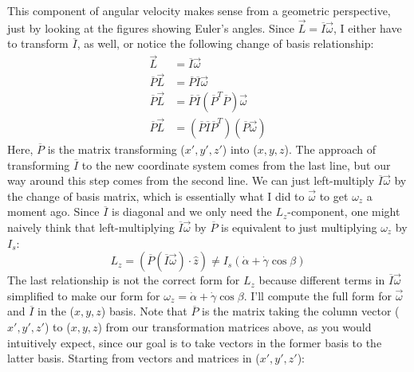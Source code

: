 \documentclass[10pt]{article}
\begin{document}
This component of angular velocity makes sense from a geometric perspective, 
just by looking at the figures showing Euler's angles. 
Since $\vec{L} = \overline{I}\vec{\omega}$, I either have to transform 
$\overline{I}$, as well, or notice the following change of basis 
relationship:
\begin{align*}
    \vec{L} &= \overline{I}\vec{\omega} \\
    \overline{P}\vec{L} &= \overline{P}\overline{I}\vec{\omega} \\
    \overline{P}\vec{L} &= 
        \overline{P}\overline{I}
        \left(\overline{P}^T\overline{P}\right)\vec{\omega} \\
    \overline{P}\vec{L} &=
        \left(\overline{P}\overline{I}\overline{P}^T\right)
        \left(\overline{P}\vec{\omega}\right)
\end{align*}
Here, $\overline{P}$ is the matrix transforming 
($x',y',z'$) into ($x,y,z$).
The approach of transforming $\overline{I}$ to the new coordinate system 
comes from the last line, but our way around this step comes from the 
second line. We can just left-multiply $\overline{I}\vec{\omega}$ by 
the change of basis matrix, which is essentially what I 
did to $\vec\omega$ to get $\omega_z$ a moment ago. Since $\overline{I}$ is 
diagonal and we only need the $L_z$-component, one might naively think 
that left-multiplying 
$\overline{I}\vec{\omega}$ by $\overline{P}$ is equivalent to just multiplying 
$\omega_z$ by $I_s$:
\begin{equation*}
    L_z = \left(\overline{P}
        \left(\overline{I}\vec{\omega}\right)\cdot\hat{z}\right) \neq 
        I_s(\dot\alpha + \dot\gamma\cos\beta)
\end{equation*}
The last relationship is not the correct form for $L_z$ 
because different terms in $\overline{I}\vec{\omega}$ simplified to make
our form for $\omega_z = \dot\alpha+\dot\gamma\cos\beta$. 
I'll compute the full form for $\vec\omega$ and $\overline{I}$ in the 
($x,y,z$) basis. Note that $\overline{P}$ is the matrix taking the 
column vector ($x',y',z'$) to ($x,y,z$) from our transformation matrices 
above, as you would intuitively expect, since our 
goal is to take vectors in the former basis to the latter basis. 
Starting from vectors and matrices in ($x',y',z'$):
\end{document}

